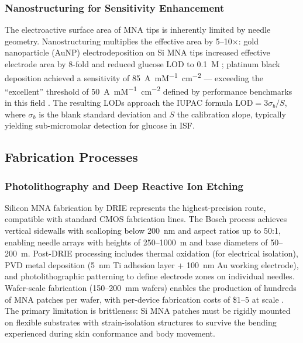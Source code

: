 \documentclass[review,1p]{elsarticle}
\begin{document}
\subsubsection{Nanostructuring for Sensitivity Enhancement}

The electroactive surface area of MNA tips is inherently limited by needle geometry. Nanostructuring multiplies the effective area by 5--10$\times$: gold nanoparticle (AuNP) electrodeposition on Si MNA tips increased effective electrode area by 8-fold and reduced glucose LOD to 0.1~\textmu{}M \cite{Bhansali2023Pt}; platinum black deposition achieved a sensitivity of 85~\textmu{}A~mM\textsuperscript{$-1$}~cm\textsuperscript{$-2$} — exceeding the ``excellent'' threshold of 50~\textmu{}A~mM\textsuperscript{$-1$}~cm\textsuperscript{$-2$} defined by performance benchmarks in this field \cite{Bhansali2023Pt}. The resulting LODs approach the IUPAC formula $\text{LOD} = 3\sigma_b / S$, where $\sigma_b$ is the blank standard deviation and $S$ the calibration slope, typically yielding sub-micromolar detection for glucose in ISF.

\subsection{Fabrication Processes}
\label{subsec:processes}

\subsubsection{Photolithography and Deep Reactive Ion Etching}

Silicon MNA fabrication by DRIE represents the highest-precision route, compatible with standard CMOS fabrication lines. The Bosch process achieves vertical sidewalls with scalloping below 200~nm and aspect ratios up to 50:1, enabling needle arrays with heights of 250--1000~\textmu{}m and base diameters of 50--200~\textmu{}m. Post-DRIE processing includes thermal oxidation (for electrical isolation), PVD metal deposition (5~nm Ti adhesion layer + 100~nm Au working electrode), and photolithographic patterning to define electrode zones on individual needles. Wafer-scale fabrication (150--200~mm wafers) enables the production of hundreds of MNA patches per wafer, with per-device fabrication costs of \$1--5 at scale \cite{Dervisevic2021}. The primary limitation is brittleness: Si MNA patches must be rigidly mounted on flexible substrates with strain-isolation structures to survive the bending experienced during skin conformance and body movement.
\end{document}
